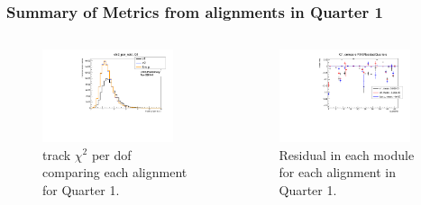 \documentclass[aspectratio=1610, 12pt]{beamer}
\begin{document}
\begin{frame}\frametitle{Summary of Metrics from alignments in Quarter 1}
  \begin{columns}
    \begin{column}[c]{0.48\textwidth}
      \begin{figure}
        \centering
        \includegraphics[width=0.9\textwidth]{2023-mar-9-DPG/chi2_per_ndof_Q1.pdf}
        \caption{track $\chi^2$ per dof comparing each alignment for Quarter 1.}
      \end{figure}
    \end{column}
    \begin{column}{0.48\textwidth}
      \begin{figure}
        \includegraphics[width=0.9\textwidth]{2023-mar-9-DPG/RMSResidualQuarters_Q1.pdf}
        \caption{Residual in each module for each alignment in Quarter 1.}
      \end{figure}
    \end{column}
  \end{columns}
\end{frame}
\end{document}
